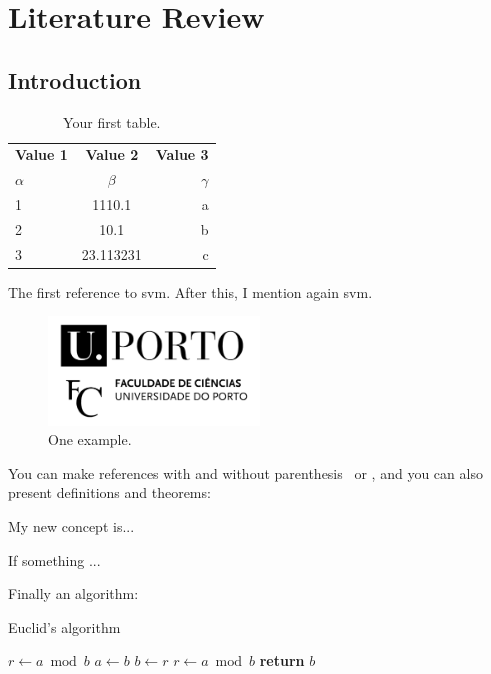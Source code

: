 \chapter{Literature Review}
\label{LR}

\section{Introduction}\label{LR:intro}

\begin{table}[h!]
  \begin{center}
    \begin{tabular}{l|c|r}
      \textbf{Value 1} & \textbf{Value 2} & \textbf{Value 3}\\
      $\alpha$ & $\beta$ & $\gamma$ \\
      \hline
      1 & 1110.1 & a\\
      2 & 10.1 & b\\
      3 & 23.113231 & c\\
    \end{tabular}
  \end{center}
    \caption{Your first table.}
    \label{tab:table1}
\end{table}

The first reference to \gls{svm}. After this, I mention again \gls{svm}.

\begin{figure}
    \centering
    \includegraphics[width=0.5\textwidth]{fc_newlogo.jpeg}
    \caption{One example.}
    \label{fig:example}
\end{figure}

You can make references with and without parenthesis~\cite{AlmGot89} or \citep{AlmGot89}, and you can also present definitions and theorems:

\begin{definition}\label{def:def1}
My new concept is...
\end{definition}

\begin{theorem}\label{th:th1}
If something ...
\end{theorem}


Finally an algorithm:

\begin{algorithm}
\caption{Euclid's algorithm}\label{alg:euclid}
\begin{algorithmic}[1]
\State $r\gets a\bmod b$
\State $a\gets b$
\State $b\gets r$
\State $r\gets a\bmod b$
\EndWhile\label{euclidendwhile}
\State \textbf{return} $b$
\EndProcedure
\end{algorithmic}
\end{algorithm}